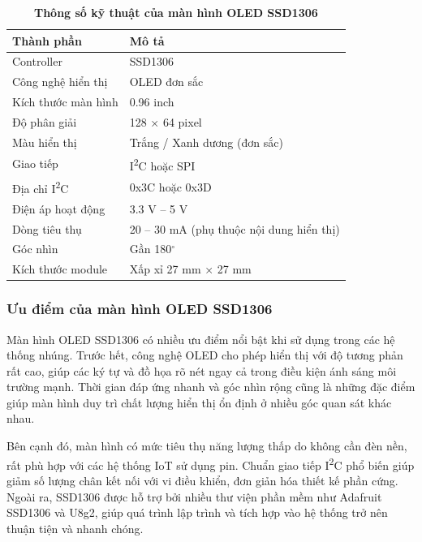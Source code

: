 \documentclass{article}
\begin{document}
	\begin{table}[H]
		\caption[Thông số kỹ thuật của màn hình OLED SSD1306]{\bfseries \fontsize{12pt}{0pt}\selectfont Thông số kỹ thuật của màn hình OLED SSD1306}
		\label{tab23}
		\centering
		\begin{tabular}{|p{4.5cm}|p{8.5cm}|}
			\hline
			\textbf{Thành phần} & \textbf{Mô tả} \\ 
			\hline
			Controller & SSD1306 \\ 
			\hline
			Công nghệ hiển thị & OLED đơn sắc \\ 
			\hline
			Kích thước màn hình & 0.96 inch \\ 
			\hline
			Độ phân giải & 128 × 64 pixel \\ 
			\hline
			Màu hiển thị & Trắng / Xanh dương (đơn sắc) \\ 
			\hline
			Giao tiếp & I\textsuperscript{2}C hoặc SPI \\ 
			\hline
			Địa chỉ I\textsuperscript{2}C & 0x3C hoặc 0x3D \\ 
			\hline
			Điện áp hoạt động & 3.3 V – 5 V \\ 
			\hline
			Dòng tiêu thụ & 20 – 30 mA (phụ thuộc nội dung hiển thị) \\ 
			\hline
			Góc nhìn & Gần 180$^\circ$ \\ 
			\hline
			Kích thước module & Xấp xỉ 27 mm × 27 mm \\ 
			\hline
		\end{tabular}
	\end{table}
	
	\subsubsection{Ưu điểm của màn hình OLED SSD1306}
	
	Màn hình OLED SSD1306 có nhiều ưu điểm nổi bật khi sử dụng trong các hệ thống nhúng. Trước hết, công nghệ OLED cho phép hiển thị với độ tương phản rất cao, giúp các ký tự và đồ họa rõ nét ngay cả trong điều kiện ánh sáng môi trường mạnh. Thời gian đáp ứng nhanh và góc nhìn rộng cũng là những đặc điểm giúp màn hình duy trì chất lượng hiển thị ổn định ở nhiều góc quan sát khác nhau.
	
	Bên cạnh đó, màn hình có mức tiêu thụ năng lượng thấp do không cần đèn nền, rất phù hợp với các hệ thống IoT sử dụng pin. Chuẩn giao tiếp I\textsuperscript{2}C phổ biến giúp giảm số lượng chân kết nối với vi điều khiển, đơn giản hóa thiết kế phần cứng. Ngoài ra, SSD1306 được hỗ trợ bởi nhiều thư viện phần mềm như Adafruit SSD1306 và U8g2, giúp quá trình lập trình và tích hợp vào hệ thống trở nên thuận tiện và nhanh chóng.
	
\end{document}
